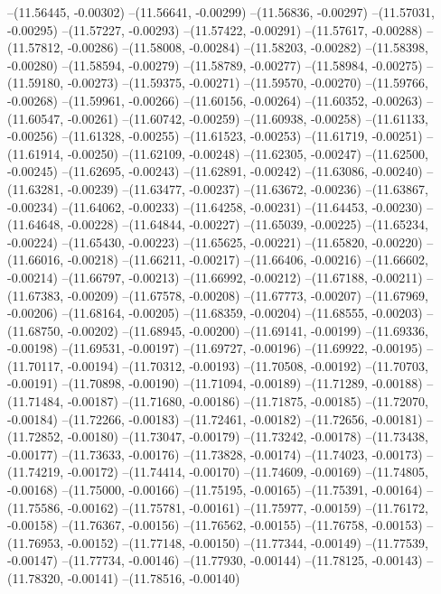 --(11.56445, -0.00302)
--(11.56641, -0.00299)
--(11.56836, -0.00297)
--(11.57031, -0.00295)
--(11.57227, -0.00293)
--(11.57422, -0.00291)
--(11.57617, -0.00288)
--(11.57812, -0.00286)
--(11.58008, -0.00284)
--(11.58203, -0.00282)
--(11.58398, -0.00280)
--(11.58594, -0.00279)
--(11.58789, -0.00277)
--(11.58984, -0.00275)
--(11.59180, -0.00273)
--(11.59375, -0.00271)
--(11.59570, -0.00270)
--(11.59766, -0.00268)
--(11.59961, -0.00266)
--(11.60156, -0.00264)
--(11.60352, -0.00263)
--(11.60547, -0.00261)
--(11.60742, -0.00259)
--(11.60938, -0.00258)
--(11.61133, -0.00256)
--(11.61328, -0.00255)
--(11.61523, -0.00253)
--(11.61719, -0.00251)
--(11.61914, -0.00250)
--(11.62109, -0.00248)
--(11.62305, -0.00247)
--(11.62500, -0.00245)
--(11.62695, -0.00243)
--(11.62891, -0.00242)
--(11.63086, -0.00240)
--(11.63281, -0.00239)
--(11.63477, -0.00237)
--(11.63672, -0.00236)
--(11.63867, -0.00234)
--(11.64062, -0.00233)
--(11.64258, -0.00231)
--(11.64453, -0.00230)
--(11.64648, -0.00228)
--(11.64844, -0.00227)
--(11.65039, -0.00225)
--(11.65234, -0.00224)
--(11.65430, -0.00223)
--(11.65625, -0.00221)
--(11.65820, -0.00220)
--(11.66016, -0.00218)
--(11.66211, -0.00217)
--(11.66406, -0.00216)
--(11.66602, -0.00214)
--(11.66797, -0.00213)
--(11.66992, -0.00212)
--(11.67188, -0.00211)
--(11.67383, -0.00209)
--(11.67578, -0.00208)
--(11.67773, -0.00207)
--(11.67969, -0.00206)
--(11.68164, -0.00205)
--(11.68359, -0.00204)
--(11.68555, -0.00203)
--(11.68750, -0.00202)
--(11.68945, -0.00200)
--(11.69141, -0.00199)
--(11.69336, -0.00198)
--(11.69531, -0.00197)
--(11.69727, -0.00196)
--(11.69922, -0.00195)
--(11.70117, -0.00194)
--(11.70312, -0.00193)
--(11.70508, -0.00192)
--(11.70703, -0.00191)
--(11.70898, -0.00190)
--(11.71094, -0.00189)
--(11.71289, -0.00188)
--(11.71484, -0.00187)
--(11.71680, -0.00186)
--(11.71875, -0.00185)
--(11.72070, -0.00184)
--(11.72266, -0.00183)
--(11.72461, -0.00182)
--(11.72656, -0.00181)
--(11.72852, -0.00180)
--(11.73047, -0.00179)
--(11.73242, -0.00178)
--(11.73438, -0.00177)
--(11.73633, -0.00176)
--(11.73828, -0.00174)
--(11.74023, -0.00173)
--(11.74219, -0.00172)
--(11.74414, -0.00170)
--(11.74609, -0.00169)
--(11.74805, -0.00168)
--(11.75000, -0.00166)
--(11.75195, -0.00165)
--(11.75391, -0.00164)
--(11.75586, -0.00162)
--(11.75781, -0.00161)
--(11.75977, -0.00159)
--(11.76172, -0.00158)
--(11.76367, -0.00156)
--(11.76562, -0.00155)
--(11.76758, -0.00153)
--(11.76953, -0.00152)
--(11.77148, -0.00150)
--(11.77344, -0.00149)
--(11.77539, -0.00147)
--(11.77734, -0.00146)
--(11.77930, -0.00144)
--(11.78125, -0.00143)
--(11.78320, -0.00141)
--(11.78516, -0.00140)
